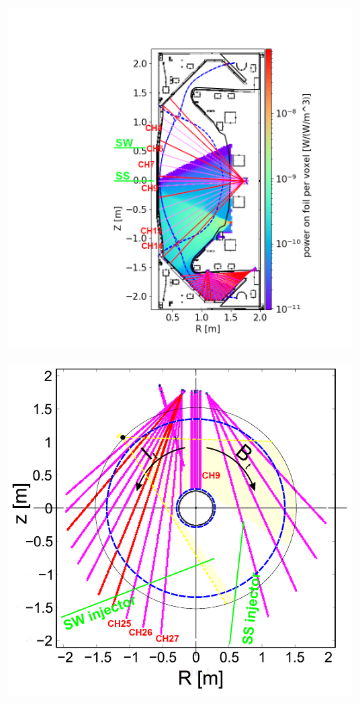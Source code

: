 \begin{figure}[!ht]
     \centering
     \begin{subfigure}{0.48\linewidth}
         \centering
         \includegraphics[trim={175 20 65 60},clip,width=\textwidth]{Chapters/chapter2/figs/res_bolo5.png}
         \caption{}
         \label{fig:res_bolo1a}
     \end{subfigure}
     \begin{subfigure}{0.48\linewidth}
         \centering
         \includegraphics[trim={20 0 70 0},clip,width=\textwidth]{Chapters/chapter2/figs/res_bolo_toroidal3.png}

\end{subfigure}
\end{figure}
